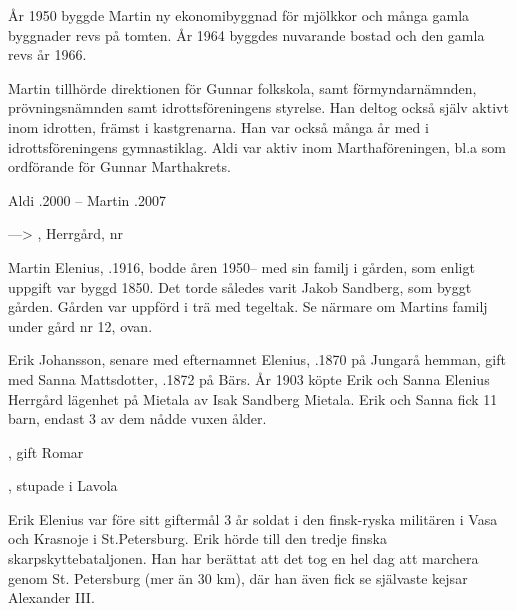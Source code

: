 År 1950 byggde Martin ny ekonomibyggnad för mjölkkor och många gamla byggnader revs på tomten. År 1964 byggdes nuvarande bostad och den gamla revs år 1966.

Martin tillhörde direktionen för Gunnar folkskola, samt förmyndarnämnden, prövningsnämnden samt idrottsföreningens styrelse. Han deltog också själv aktivt inom idrotten, främst i kastgrenarna. Han var också många år med i idrottsföreningens gymnastiklag. Aldi var aktiv inom Marthaföreningen, bl.a som ordförande för Gunnar Marthakrets.

Aldi .2000  --  Martin .2007


---> , Herrgård,	nr 



Martin Elenius, .1916,  bodde åren 1950-- med sin familj i gården, som enligt uppgift var byggd 1850. Det torde således varit Jakob Sandberg, som byggt gården. Gården var uppförd i trä med tegeltak. Se närmare om Martins familj under gård nr 12, ovan.

Erik Johansson, senare med efternamnet Elenius,  .1870 på Jungarå hemman, gift med Sanna Mattsdotter,  .1872 på Bärs. År 1903 köpte Erik och Sanna Elenius Herrgård lägenhet på Mietala av Isak Sandberg Mietala. Erik och Sanna fick 11 barn, endast 3 av dem nådde vuxen ålder.
\begin{jhchildren}
  \item {}
  \item {}
  \item {}
  \item {}
  \item {}, gift Romar
  \item {}
  \item {}
  \item {}
  \item {}
  \item {}
  \item {}, stupade i Lavola
\end{jhchildren}
Erik Elenius var före sitt giftermål 3 år soldat i den finsk-ryska militären i Vasa och Krasnoje i St.Petersburg. Erik hörde till den tredje finska skarpskyttebataljonen. Han har berättat att det tog en hel dag att marchera genom St. Petersburg (mer än 30 km), där han även fick se självaste kejsar Alexander III.

